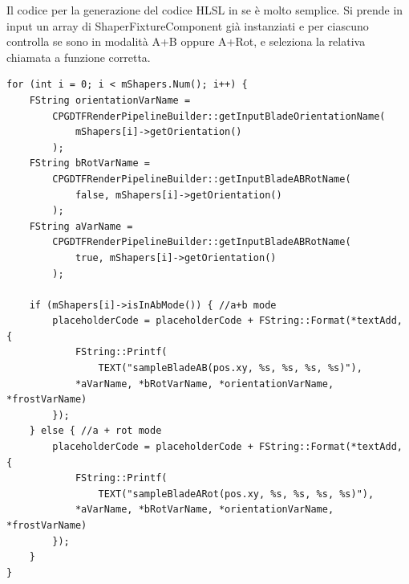 \documentclass[main.tex]{subfiles}
\begin{document}
Il codice per la generazione del codice HLSL in se è molto semplice. Si prende in input un array di ShaperFixtureComponent già instanziati e per ciascuno controlla se sono in modalità A+B oppure A+Rot, e seleziona la relativa chiamata a funzione corretta.
\begin{lstlisting}
for (int i = 0; i < mShapers.Num(); i++) {
    FString orientationVarName =
        CPGDTFRenderPipelineBuilder::getInputBladeOrientationName(
            mShapers[i]->getOrientation()
        );
    FString bRotVarName =
        CPGDTFRenderPipelineBuilder::getInputBladeABRotName(
            false, mShapers[i]->getOrientation()
        );
    FString aVarName =
        CPGDTFRenderPipelineBuilder::getInputBladeABRotName(
            true, mShapers[i]->getOrientation()
        );

    if (mShapers[i]->isInAbMode()) { //a+b mode
        placeholderCode = placeholderCode + FString::Format(*textAdd, {
            FString::Printf(
                TEXT("sampleBladeAB(pos.xy, %s, %s, %s, %s)"),
            *aVarName, *bRotVarName, *orientationVarName, *frostVarName)
        });
    } else { //a + rot mode
        placeholderCode = placeholderCode + FString::Format(*textAdd, {
            FString::Printf(
                TEXT("sampleBladeARot(pos.xy, %s, %s, %s, %s)"),
            *aVarName, *bRotVarName, *orientationVarName, *frostVarName)
        });
    }
}
\end{lstlisting}
\end{document}
